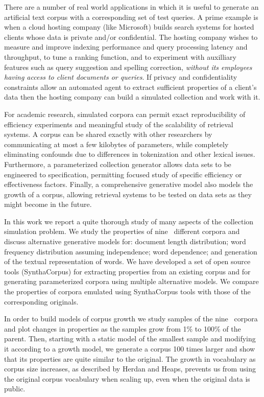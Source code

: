 \documentclass[11pt]{report}
\newcommand{\numcolls}{nine}
\begin{document}
There are a number of real world applications in which it is useful to
generate an artificial text corpus with a corresponding set of test
queries. A prime example is when a cloud hosting company (like
Microsoft) builds search
systems for hosted clients whose data is private and/or confidential.
The hosting company wishes to measure and improve indexing performance
and query processing latency and throughput, to tune a ranking
function, and to experiment with auxilliary features such as query
suggestion and spelling correction, \textit{without its employees
  having access to client documents or queries}.  If privacy and
confidentiality constraints allow an automated agent to extract
sufficient properties of a client's data then the hosting company can
build a simulated collection and work with it.

For academic research, simulated corpora can permit exact
reproducibility of efficiency experiments and meaningful study of the
scalability of retrieval systems.  A corpus can be shared exactly with
other researchers by communicating at most a few kilobytes of
parameters, while completely eliminating confounds due to differences
in tokenization and other lexical issues.  Furthermore, a
parameterized collection generator allows data sets to be engineered
to specification, permitting focused study of specific efficiency or
effectiveness factors.  Finally, a comprehensive generative model
also models the growth of a corpus, allowing retrieval systems to be
tested on data sets as they might become in the future.

In this work we report a quite thorough study of many aspects of the
collection simulation problem.  We study the properties of \numcolls~
different corpora and discuss alternative generative models for:
document length distribution; word frequency distribution assuming
independence; word dependence; and generation of the textual
representation of words.  We have developed a set of open source tools
(SynthaCorpus) for extracting properties from an existing corpus  and
for generating parameterized corpora using multiple alternative models.
We compare the properties of corpora emulated using SynthaCorpus tools
with those of the corresponding originals.

In order to build models of corpus growth we study samples of the \numcolls~
corpora and plot changes in properties as the samples grow from 1\% to
100\% of the parent.  Then, starting with a static model of the smallest
sample and modifying it according to a growth model, we generate a
corpus 100 times larger and show that its properties are quite similar
to the original.  The growth in vocabulary as corpus size
increases, as described by Herdan and Heaps, prevents us from using
the original corpus vocabulary when scaling up, even when the original
data is public.
\end{document}
